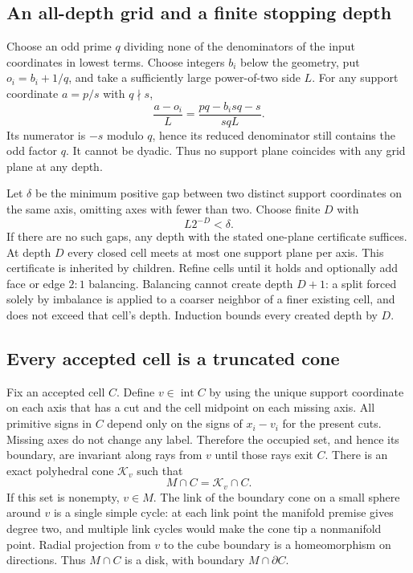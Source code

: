 \documentclass[11pt]{article}
\theoremstyle{definition}
\theoremstyle{remark}
\newcommand{\intr}{\operatorname{int}}
\begin{document}
\subsection{An all-depth grid and a finite stopping depth}

Choose an odd prime $q$ dividing none of the denominators of the input
coordinates in lowest terms. Choose integers $b_i$ below the geometry,
put $o_i=b_i+1/q$, and take a sufficiently large power-of-two side $L$.
For any support coordinate $a=p/s$ with $q\nmid s$,
\[
  \frac{a-o_i}{L}
  =\frac{pq-b_i sq-s}{sqL}.
\]
Its numerator is $-s$ modulo $q$, hence its reduced denominator still
contains the odd factor $q$. It cannot be dyadic. Thus no support plane
coincides with any grid plane at any depth.

Let $\delta$ be the minimum positive gap between two distinct support
coordinates on the same axis, omitting axes with fewer than two. Choose
finite $D$ with
\[
  L2^{-D}<\delta. \tag{3}\label{eq:orth-depth}
\]
If there are no such gaps, any depth with the stated one-plane certificate
suffices. At depth $D$ every closed cell meets at most one support plane
per axis. This certificate is inherited by children. Refine cells until
it holds and optionally add face or edge $2{:}1$ balancing. Balancing
cannot create depth $D+1$: a split forced solely by imbalance is applied
to a coarser neighbor of a finer existing cell, and does not exceed that
cell's depth. Induction bounds every created depth by $D$.

\subsection{Every accepted cell is a truncated cone}

Fix an accepted cell $C$. Define $v\in\intr C$ by using the unique support
coordinate on each axis that has a cut and the cell midpoint on each
missing axis. All primitive signs in $C$ depend only on the signs of
$x_i-v_i$ for the present cuts. Missing axes do not change any label.
Therefore the occupied set, and hence its boundary, are invariant along
rays from $v$ until those rays exit $C$. There is an exact polyhedral
cone $\mathcal K_v$ such that
\[
  M\cap C=\mathcal K_v\cap C.
\]
If this set is nonempty, $v\in M$. The link of the boundary cone on a
small sphere around $v$ is a single simple cycle: at each link point the
manifold premise gives degree two, and multiple link cycles would make
the cone tip a nonmanifold point. Radial projection from $v$ to the cube
boundary is a homeomorphism on directions. Thus $M\cap C$ is a disk,
with boundary $M\cap\partial C$.
\end{document}
